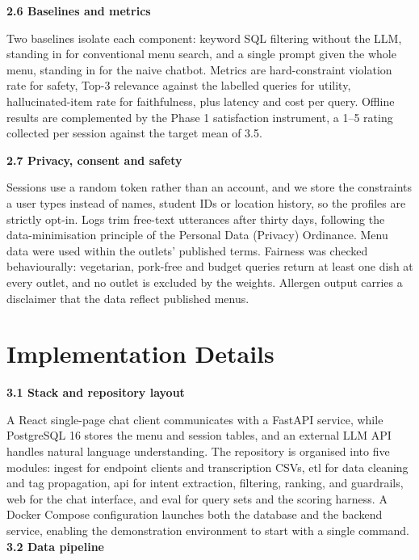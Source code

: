 \documentclass{article}
\begin{document}
\textbf{2.6 Baselines and metrics} 

Two baselines isolate each component: keyword SQL filtering without the LLM, standing in for conventional menu search, and a single prompt given the whole menu, standing in for the naive chatbot. Metrics are hard-constraint violation rate for safety, Top-3 relevance against the labelled queries for utility, hallucinated-item rate for faithfulness, plus latency and cost per query. Offline results are complemented by the Phase 1 satisfaction instrument, a 1--5 rating collected per session against the target mean of 3.5.

\textbf{2.7 Privacy, consent and safety} 

Sessions use a random token rather than an account, and we store the constraints a user types instead of names, student IDs or location history, so the profiles are strictly opt-in. Logs trim free-text utterances after thirty days, following the data-minimisation principle of the Personal Data (Privacy) Ordinance. Menu data were used within the outlets' published terms. Fairness was checked behaviourally: vegetarian, pork-free and budget queries return at least one dish at every outlet, and no outlet is excluded by the weights. Allergen output carries a disclaimer that the data reflect published menus.

\section{Implementation Details}


\textbf{3.1 Stack and repository layout}

A React single-page chat client communicates with a FastAPI service, while PostgreSQL 16 stores the menu and session tables, and an external LLM API handles natural language understanding. The repository is organised into five modules: ingest for endpoint clients and transcription CSVs, etl for data cleaning and tag propagation, api for intent extraction, filtering, ranking, and guardrails, web for the chat interface, and eval for query sets and the scoring harness. A Docker Compose configuration launches both the database and the backend service, enabling the demonstration environment to start with a single command.
\textbf{3.2 Data pipeline}
\end{document}
